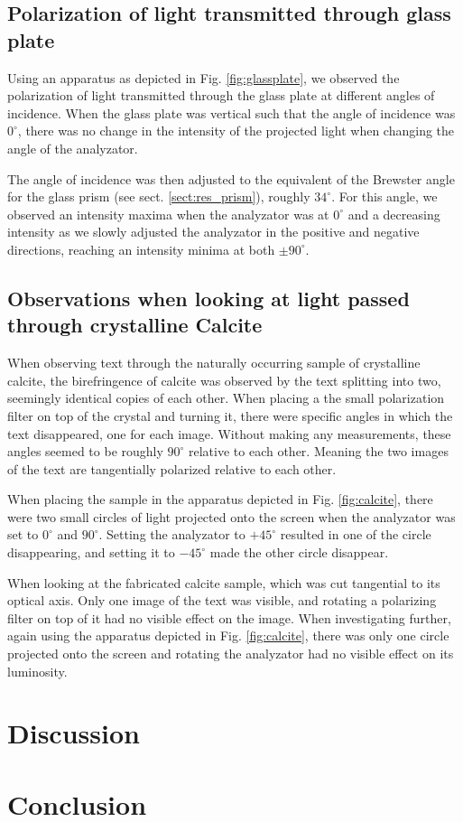 \documentclass[11pt,a4paper]{article}
\begin{document}
  \subsection{Polarization of light transmitted through glass plate}
    Using an apparatus as depicted in Fig. \ref{fig:glassplate}, we observed the polarization of light transmitted through the glass plate at different angles of incidence. When the glass plate was vertical such that the angle of incidence was $0^\circ$, there was no change in the intensity of the projected light when changing the angle of the analyzator. 

    The angle of incidence was then adjusted to the equivalent of the Brewster angle for the glass prism (see sect. \ref{sect:res_prism}), roughly $34^\circ$. For this angle, we observed an intensity maxima when the analyzator was at $0^\circ$ and a decreasing intensity as we slowly adjusted the analyzator in the positive and negative directions, reaching an intensity minima at both $\pm 90^\circ$. 

  \subsection{Observations when looking at light passed through crystalline Calcite}
    When observing text through the naturally occurring sample of crystalline calcite, the birefringence of calcite was observed by the text splitting into two, seemingly identical copies of each other. When placing a the small polarization filter on top of the crystal and turning it, there were specific angles in which the text disappeared, one for each image. Without making any measurements, these angles seemed to be roughly $90^\circ$ relative to each other. Meaning the two images of the text are tangentially polarized relative to each other. 

    When placing the sample in the apparatus depicted in Fig. \ref{fig:calcite}, there were two small circles of light projected onto the screen when the analyzator was set to $0^\circ$ and $90^\circ$.  Setting the analyzator to $+45^\circ$ resulted in one of the circle disappearing, and setting it to $-45^\circ$ made the other circle disappear.

    When looking at the fabricated calcite sample, which was cut tangential to its optical axis. Only one image of the text was visible, and rotating a polarizing filter on top of it had no visible effect on the image. When investigating further, again using the apparatus depicted in Fig. \ref{fig:calcite}, there was only one circle projected onto the screen and rotating the analyzator had no visible effect on its luminosity. 

\section{\label{sect:discuss}Discussion}

\section{\label{sect:conclusion}Conclusion}

\onecolumn




\end{document}
